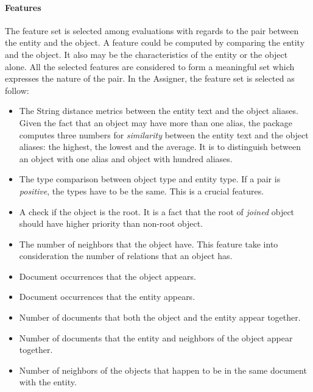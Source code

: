 \paragraph{Features}

The feature set is selected among evaluations with regards to the pair between
the entity and the object. A feature could be computed by comparing the entity 
and the object. It also may be the characteristics of the entity or the object 
alone. All the selected features are considered to form a meaningful set which
expresses the nature of the pair. In the Assigner, the feature set is selected 
as follow:

\begin{itemize}
\item The String distance metrics between the entity text and the object aliases. Given 
the fact that an object may have more than one alias, the package computes three numbers for 
\textit{similarity} between the entity text and the object aliases: the highest, the lowest and
the average. It is to distinguish between an object with one alias and object with hundred aliases.
\item The type comparison between object type and entity type. If a pair is \textit{positive},
the types have to be the same. This is a crucial features. 
\item A check if the object is the root. It is a fact that the root of \textit{joined} object 
should have higher priority than non-root object.
\item The number of neighbors that the object have. This feature take into consideration the number 
of relations that an object has.
\item Document occurrences that the object appears. 
\item Document occurrences that the entity appears.
\item Number of documents that both the object and the entity appear together.
\item Number of documents that the entity and neighbors of the object appear together.
\item Number of neighbors of the objects that happen to be in the same document with the entity.
\end{itemize}



